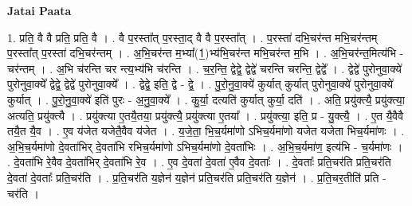 \documentclass[17pt]{extarticle}
\begin{document}
\textbf{Jatai Paata} \newline

1. प्रति॒ वै वै प्रति॒ प्रति॒ वै । . वै प॒रस्ता᳚त् प॒रस्ता॒द् वै वै प॒रस्ता᳚त् । . प॒रस्ता॑ दभि॒चर॑न्त मभि॒चर॑न्तम् प॒रस्ता᳚त् प॒रस्ता॑ दभि॒चर॑न्तम् । . अ॒भि॒चर॑न्त म॒भ्या᳚(1॒)भ्य॑भि॒चर॑न्त मभि॒चर॑न्त म॒भि । . अ॒भि॒चर॑न्त॒मित्य॑भि - चर॑न्तम् । . अ॒भि च॑रन्ति चर न्त्य॒भ्य॑भि च॑रन्ति । . च॒र॒न्ति॒ द्वेद्वे॒ द्वेद्वे॑ चरन्ति चरन्ति॒ द्वेद्वे᳚ । . द्वेद्वे॑ पुरोनुवा॒क्ये॑ पुरोनुवा॒क्ये᳚ द्वेद्वे॒ द्वेद्वे॑ पुरोनुवा॒क्ये᳚ । . द्वेद्वे॒ इति॒ द्वे - द्वे॒ । . पु॒रो॒नु॒वा॒क्ये॑ कुर्यात् कुर्यात् पुरोनुवा॒क्ये॑ पुरोनुवा॒क्ये॑ कुर्यात् । . पु॒रो॒नु॒वा॒क्ये॑ इति॑ पुरः - अ॒नु॒वा॒क्ये᳚ । . कु॒र्या॒ दत्यति॑ कुर्यात् कुर्या॒ दति॑ । . अति॒ प्रयु॑क्त्यै॒ प्रयु॑क्त्या॒ अत्यति॒ प्रयु॑क्त्यै । . प्रयु॑क्त्या ए॒तयै॒तया॒ प्रयु॑क्त्यै॒ प्रयु॑क्त्या ए॒तया᳚ । . प्रयु॑क्त्या॒ इति॒ प्र - यु॒क्त्यै॒ । . ए॒त यै॒वैवै तयै॒त यै॒व । . ए॒व य॑जेत यजेतै॒वैव य॑जेत । . य॒जे॒ता॒ भि॒च॒र्यमा॑णो ऽभिच॒र्यमा॑णो यजेत यजेता भिच॒र्यमा॑णः । . अ॒भि॒च॒र्यमा॑णो दे॒वता॑भिर् दे॒वता॑भि रभिच॒र्यमा॑णो ऽभिच॒र्यमा॑णो दे॒वता॑भिः । . अ॒भि॒च॒र्यमा॑ण॒ इत्य॑भि - च॒र्यमा॑णः । . दे॒वता॑भि रे॒वैव दे॒वता॑भिर् दे॒वता॑भि रे॒व । . ए॒व दे॒वता॑ दे॒वता॑ ए॒वैव दे॒वताः᳚ । . दे॒वताः᳚ प्रति॒चर॑ति प्रति॒चर॑ति दे॒वता॑ दे॒वताः᳚ प्रति॒चर॑ति । . प्र॒ति॒चर॑ति य॒ज्ञेन॑ य॒ज्ञेन॑ प्रति॒चर॑ति प्रति॒चर॑ति य॒ज्ञेन॑ । . प्र॒ति॒चर॒तीति॑ प्रति - चर॑ति । \newline
\end{document}

